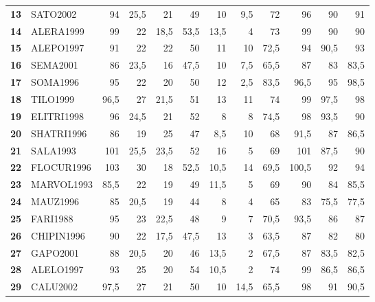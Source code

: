 \begin{landscape}
\begin{table}[p]
\begin{tabular}{>{\bfseries}cl*{10}{D{,}{,}{-1}}}
13 & SATO2002 & 94 & 25,5 & 21 & 49 & 10 & 9,5 & 72 & 96 & 90 & 91 \\
14 & ALERA1999 & 99 & 22 & 18,5 & 53,5 & 13,5 & 4 & 73 & 99 & 90 & 90 \\
15 & ALEPO1997 & 91 & 22 & 22 & 50 & 11 & 10 & 72,5 & 94 & 90,5 & 93 \\
16 & SEMA2001 & 86 & 23,5 & 16 & 47,5 & 10 & 7,5 & 65,5 & 87 & 83 & 83,5 \\
17 & SOMA1996 & 95 & 22 & 20 & 50 & 12 & 2,5 & 83,5 & 96,5 & 95 & 98,5 \\
18 & TILO1999 & 96,5 & 27 & 21,5 & 51 & 13 & 11 & 74 & 99 & 97,5 & 98 \\
19 & ELITRI1998 & 96 & 24,5 & 21 & 52 & 8 & 8 & 74,5 & 98 & 93,5 & 90 \\
20 & SHATRI1996 & 86 & 19 & 25 & 47 & 8,5 & 10 & 68 & 91,5 & 87 & 86,5 \\
21 & SALA1993 & 101 & 25,5 & 23,5 & 52 & 16 & 5 & 69 & 101 & 87,5 & 90 \\
22 & FLOCUR1996 & 103 & 30 & 18 & 52,5 & 10,5 & 14 & 69,5 & 100,5 & 92 & 94 \\
23 & MARVOL1993 & 85,5 & 22 & 19 & 49 & 11,5 & 5 & 69 & 90 & 84 & 85,5 \\
24 & MAUZ1996 & 85 & 20,5 & 19 & 44 & 8 & 4 & 65 & 83 & 75,5 & 77,5 \\
25 & FARI1988 & 95 & 23 & 22,5 & 48 & 9 & 7 & 70,5 & 93,5 & 86 & 87 \\
26 & CHIPIN1996 & 90 & 22 & 17,5 & 47,5 & 13 & 3 & 63,5 & 87 & 82 & 80 \\
27 & GAPO2001 & 88 & 20,5 & 20 & 46 & 13,5 & 2 & 67,5 & 87 & 83,5 & 82,5 \\
28 & ALELO1997 & 93 & 25 & 20 & 54 & 10,5 & 2 & 74 & 99 & 86,5 & 86,5 \\
29 & CALU2002 & 97,5 & 27 & 21 & 50 & 10 & 14,5 & 65,5 & 98 & 91 & 90,5 \\
\bottomrule
\end{tabular}
\end{table}


\end{landscape}

